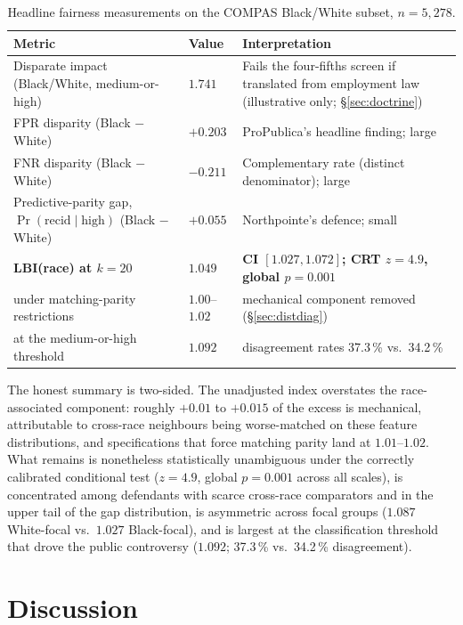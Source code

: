 \documentclass[11pt]{article}
\begin{document}
\begin{table}[h]
\centering
\caption{Headline fairness measurements on the COMPAS Black/White
subset, $n = 5{,}278$.}
\label{tab:summary}
\begin{tabular}{p{}lp{}}
\toprule
\textbf{Metric} & \textbf{Value} & \textbf{Interpretation} \\
\midrule
Disparate impact (Black/White, medium-or-high) & $1.741$ &
Fails the four-fifths screen if translated from employment law
(illustrative only; \S\ref{sec:doctrine}) \\
FPR disparity (Black $-$ White) & $+0.203$ &
ProPublica's headline finding; large \\
FNR disparity (Black $-$ White) & $-0.211$ &
Complementary rate (distinct denominator); large \\
Predictive-parity gap, $\Pr(\text{recid}\mid\text{high})$ (Black $-$ White) & $+0.055$ &
Northpointe's defence; small \\
\midrule
\textbf{LBI(race) at $k = 20$} & $\mathbf{1.049}$ &
\textbf{CI $[1.027, 1.072]$; CRT $z = 4.9$, global $p = 0.001$} \\
\quad under matching-parity restrictions & $1.00$--$1.02$ &
mechanical component removed (\S\ref{sec:distdiag}) \\
\quad at the medium-or-high threshold & $1.092$ &
disagreement rates 37.3\,\% vs.\ 34.2\,\% \\
\bottomrule
\end{tabular}
\end{table}

The honest summary is two-sided. The unadjusted index overstates the
race-associated component: roughly $+0.01$ to $+0.015$ of the excess
is mechanical, attributable to cross-race neighbours being
worse-matched on these feature distributions, and specifications
that force matching parity land at $1.01$--$1.02$. What remains is
nonetheless statistically unambiguous under the correctly calibrated
conditional test ($z = 4.9$, global $p = 0.001$ across all scales),
is concentrated among defendants with scarce cross-race comparators
and in the upper tail of the gap distribution, is asymmetric across
focal groups ($1.087$ White-focal vs.\ $1.027$ Black-focal), and is
largest at the classification threshold that drove the public
controversy ($1.092$; 37.3\,\% vs.\ 34.2\,\% disagreement).


\section{Discussion}
\label{sec:discussion}
\end{document}
